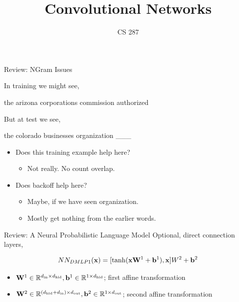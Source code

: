 \documentclass{beamer}
\title{Convolutional Networks}
\date{}
\author{CS 287}
\begin{document}
\begin{frame}
  \titlepage
\end{frame}

\begin{frame}{Review: NGram Issues}
  
  In training we might see, 

  \begin{center}
    the arizona corporations commission \alert{authorized}
  \end{center}

  But at test we see, 
  \begin{center}
    the colorado businesses organization \alert{\_\_\_}
  \end{center}
  \pause 
  
  \begin{itemize}
  \item Does this training example help here?
    \begin{itemize}
    \item Not really. No count overlap.
    \end{itemize}
    \air 
    \pause 
  \item Does backoff help here? 
    \begin{itemize}
    \item Maybe, if we have seen organization.
    \item Mostly get nothing from the earlier words.
    \end{itemize}
  \end{itemize}
\end{frame}


\begin{frame}{Review: A Neural Probabilistic Language Model }  
  Optional, direct connection layers,

  \[NN_{DMLP1}(\mathbf{x}) =  [\tanh(\mathbf{x}\mathbf{W}^1 + \mathbf{b}^1), \mathbf{x}] W^2 + \mathbf{b}^2\]

  \begin{itemize}
  \item $\mathbf{W}^1 \in \mathbb{R}^{{d_{\mathrm{in}}} \times {d_{\mathrm{hid}}}}, \mathbf{b}^1 \in \mathbb{R}^{1 \times {d_{\mathrm{hid}}}}$; first affine transformation
  \item $\mathbf{W}^2 \in \mathbb{R}^{({d_{\mathrm{hid}}} + {d_{\mathrm{in}}})  \times {d_{\mathrm{out}}}}, \mathbf{b}^2 \in \mathbb{R}^{1 \times {d_{\mathrm{out}}}}$; second affine transformation
  \end{itemize}
\end{frame}
\end{document}
